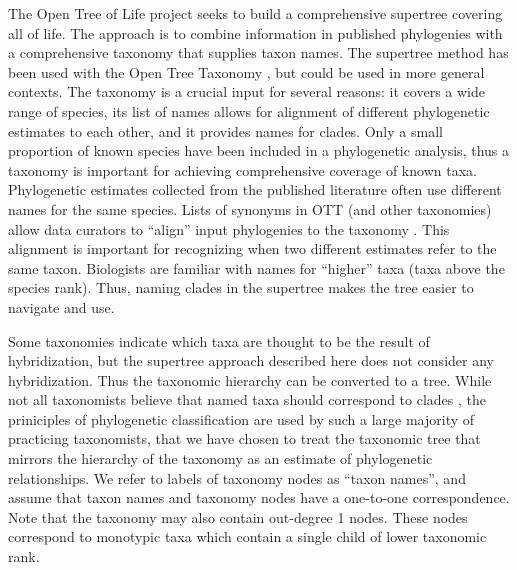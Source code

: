 \documentclass[english]{article}
\begin{document}
The Open Tree of Life project \citep{HinchliffEtAl2015} seeks to build a
comprehensive supertree \citep[see][]{redelings2017supertree} covering all of
life. The approach is to combine information in published phylogenies with a
comprehensive taxonomy that supplies taxon names. The supertree method has
been used with the Open Tree Taxonomy \citep[OTT hereafter, see][]{rees2017automated},
but could be used in more general contexts. The taxonomy is a crucial input for
several reasons: it covers a wide range of species, its list of names allows
for alignment of different phylogenetic estimates to each other, and it provides
names for clades. Only a small proportion of known species have been included in
a phylogenetic analysis, thus a taxonomy is important for achieving
comprehensive coverage of known taxa. Phylogenetic estimates collected from the
published literature often use different names for the same species. Lists of
synonyms in OTT (and other taxonomies) allow data curators to ``align'' input
phylogenies to the taxonomy \citep[see][ for discussion of the curation process
that the Open Tree of Life project uses to align phylogenetic estimates to OTT]{McTavishEtAt2015}.
This alignment is important for recognizing when two different estimates refer
to the same taxon. Biologists are familiar with names for ``higher'' taxa (taxa
above the species rank). Thus, naming clades in the supertree makes the tree
easier to navigate and use.

Some taxonomies indicate which taxa are thought to be the result of
hybridization, but the supertree approach described here does not consider any
hybridization. Thus the taxonomic hierarchy can be converted to a tree. While
not all taxonomists believe that named taxa should correspond to clades \citep[see,
for example,][]{HorandlS2010}, the priniciples of phylogenetic classification
are used by such a large majority of practicing taxonomists, that we have chosen
to treat the taxonomic tree that mirrors the hierarchy of the taxonomy as an
estimate of phylogenetic relationships. We refer to labels of taxonomy nodes as
``taxon names'', and assume that taxon names and taxonomy nodes have a
one-to-one correspondence. Note that the taxonomy may also contain out-degree
1 nodes. These nodes correspond to monotypic taxa which contain a single child
of lower taxonomic rank.
\end{document}
